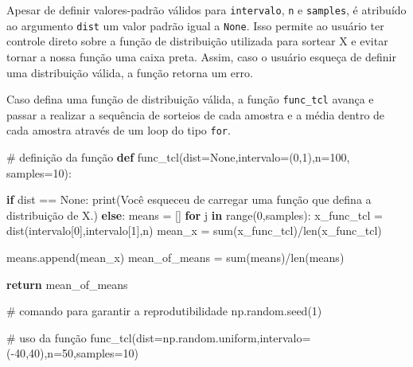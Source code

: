 \documentclass[
  brazilian,
  letterpaper,
  DIV=11,
  numbers=noendperiod]{scrreprt}
\newenvironment{Shaded}{\begin{snugshade}}{\end{snugshade}}
\newcommand{\BuiltInTok}[1]{\textcolor[rgb]{0.00,0.23,0.31}{#1}}
\newcommand{\CommentTok}[1]{\textcolor[rgb]{0.37,0.37,0.37}{#1}}
\newcommand{\ControlFlowTok}[1]{\textcolor[rgb]{0.00,0.23,0.31}{\textbf{#1}}}
\newcommand{\DecValTok}[1]{\textcolor[rgb]{0.68,0.00,0.00}{#1}}
\newcommand{\KeywordTok}[1]{\textcolor[rgb]{0.00,0.23,0.31}{\textbf{#1}}}
\newcommand{\NormalTok}[1]{\textcolor[rgb]{0.00,0.23,0.31}{#1}}
\newcommand{\OperatorTok}[1]{\textcolor[rgb]{0.37,0.37,0.37}{#1}}
\newcommand{\StringTok}[1]{\textcolor[rgb]{0.13,0.47,0.30}{#1}}
\newcommand{\VariableTok}[1]{\textcolor[rgb]{0.07,0.07,0.07}{#1}}
\begin{document}
Apesar de definir valores-padrão válidos para \texttt{intervalo},
\texttt{n} e \texttt{samples}, é atribuído ao argumento \texttt{dist} um
valor padrão igual a \texttt{None}. Isso permite ao usuário ter controle
direto sobre a função de distribuição utilizada para sortear X e evitar
tornar a nossa função uma caixa preta. Assim, caso o usuário esqueça de
definir uma distribuição válida, a função retorna um erro.

Caso defina uma função de distribuição válida, a função
\texttt{func\_tcl} avança e passar a realizar a sequência de sorteios de
cada amostra e a média dentro de cada amostra através de um loop do tipo
\texttt{for}.

\begin{Shaded}
\begin{Highlighting}[]
\CommentTok{\# definição da função}
\KeywordTok{def}\NormalTok{ func\_tcl(dist}\OperatorTok{=}\VariableTok{None}\NormalTok{,intervalo}\OperatorTok{=}\NormalTok{(}\DecValTok{0}\NormalTok{,}\DecValTok{1}\NormalTok{),n}\OperatorTok{=}\DecValTok{100}\NormalTok{, samples}\OperatorTok{=}\DecValTok{10}\NormalTok{):}
    
    \ControlFlowTok{if}\NormalTok{ dist }\OperatorTok{==} \VariableTok{None}\NormalTok{:}
        \BuiltInTok{print}\NormalTok{(}\StringTok{\textquotesingle{}Você esqueceu de carregar uma função que defina a distribuição de X.\textquotesingle{}}\NormalTok{)}
    \ControlFlowTok{else}\NormalTok{:}
\NormalTok{        means }\OperatorTok{=}\NormalTok{ []}
        \ControlFlowTok{for}\NormalTok{ j }\KeywordTok{in} \BuiltInTok{range}\NormalTok{(}\DecValTok{0}\NormalTok{,samples):}
\NormalTok{            x\_func\_tcl }\OperatorTok{=}\NormalTok{ dist(intervalo[}\DecValTok{0}\NormalTok{],intervalo[}\DecValTok{1}\NormalTok{],n)}
\NormalTok{            mean\_x }\OperatorTok{=} \BuiltInTok{sum}\NormalTok{(x\_func\_tcl)}\OperatorTok{/}\BuiltInTok{len}\NormalTok{(x\_func\_tcl)}
            
\NormalTok{            means.append(mean\_x)}
\NormalTok{            mean\_of\_means }\OperatorTok{=} \BuiltInTok{sum}\NormalTok{(means)}\OperatorTok{/}\BuiltInTok{len}\NormalTok{(means)}
        
        \ControlFlowTok{return}\NormalTok{ mean\_of\_means}

\CommentTok{\# comando para garantir a reprodutibilidade}
\NormalTok{np.random.seed(}\DecValTok{1}\NormalTok{)}

\CommentTok{\# uso da função}
\NormalTok{func\_tcl(dist}\OperatorTok{=}\NormalTok{np.random.uniform,intervalo}\OperatorTok{=}\NormalTok{(}\OperatorTok{{-}}\DecValTok{40}\NormalTok{,}\DecValTok{40}\NormalTok{),n}\OperatorTok{=}\DecValTok{50}\NormalTok{,samples}\OperatorTok{=}\DecValTok{10}\NormalTok{)}
\end{Highlighting}
\end{Shaded}
\end{document}
